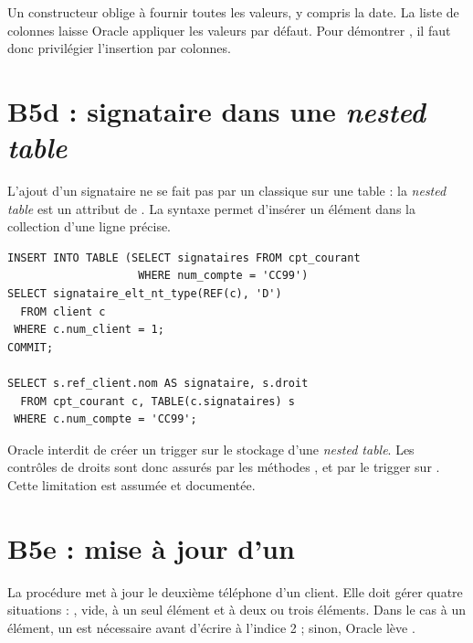 \begin{remarquebox}
Un constructeur  oblige à fournir toutes les
valeurs, y compris la date. La liste de colonnes laisse Oracle appliquer les
valeurs par défaut. Pour démontrer , il faut donc
privilégier l'insertion par colonnes.
\end{remarquebox}

\section{B5d : signataire dans une \emph{nested table}}

L'ajout d'un signataire ne se fait pas par un  classique sur une
table : la \emph{nested table} est un attribut de . La
syntaxe  permet d'insérer un
élément dans la collection d'une ligne précise.

\begin{lstlisting}[caption={B5d : ajout d'un signataire de droit \code{D}.},label={lst:b5d}]
INSERT INTO TABLE (SELECT signataires FROM cpt_courant
                    WHERE num_compte = 'CC99')
SELECT signataire_elt_nt_type(REF(c), 'D')
  FROM client c
 WHERE c.num_client = 1;
COMMIT;

SELECT s.ref_client.nom AS signataire, s.droit
  FROM cpt_courant c, TABLE(c.signataires) s
 WHERE c.num_compte = 'CC99';
\end{lstlisting}

\begin{attentionbox}
Oracle interdit de créer un trigger sur le stockage d'une \emph{nested table}.
Les contrôles de droits sont donc assurés par les méthodes
,  et par le trigger sur
. Cette limitation est assumée et documentée.
\end{attentionbox}

\section{B5e : mise à jour d'un }

La procédure  met à jour le deuxième téléphone d'un
client. Elle doit gérer quatre situations :  ,
 vide,  à un seul élément et  à deux ou
trois éléments. Dans le cas à un élément, un  est nécessaire
avant d'écrire à l'indice 2 ; sinon, Oracle lève .

